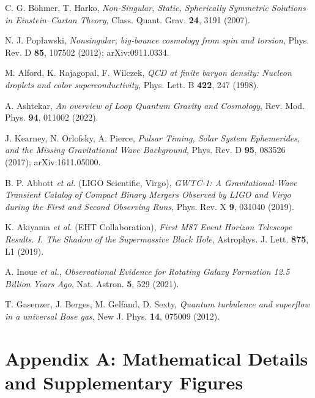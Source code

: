 \documentclass{article}
\begin{document}
\begin{thebibliography}{99}
  C. G. Böhmer, T. Harko,  
  \emph{Non‐Singular, Static, Spherically Symmetric Solutions in Einstein–Cartan Theory},  
  Class. Quant. Grav. \textbf{24}, 3191 (2007).  

  N. J. Popławski,  
  \emph{Nonsingular, big‐bounce cosmology from spin and torsion},  
  Phys. Rev. D \textbf{85}, 107502 (2012); arXiv:0911.0334.  

  M. Alford, K. Rajagopal, F. Wilczek,  
  \emph{QCD at finite baryon density: Nucleon droplets and color superconductivity},  
  Phys. Lett. B \textbf{422}, 247 (1998).  

  A. Ashtekar,  
  \emph{An overview of Loop Quantum Gravity and Cosmology},  
  Rev. Mod. Phys. \textbf{94}, 011002 (2022).  

  J. Kearney, N. Orlofsky, A. Pierce,  
  \emph{Pulsar Timing, Solar System Ephemerides, and the Missing Gravitational Wave Background},  
  Phys. Rev. D \textbf{95}, 083526 (2017); arXiv:1611.05000.  

  B. P. Abbott \emph{et al.} (LIGO Scientific, Virgo),  
  \emph{GWTC-1: A Gravitational‐Wave Transient Catalog of Compact Binary Mergers Observed by LIGO and Virgo during the First and Second Observing Runs},  
  Phys. Rev. X \textbf{9}, 031040 (2019).  

  K. Akiyama \emph{et al.} (EHT Collaboration),  
  \emph{First M87 Event Horizon Telescope Results. I. The Shadow of the Supermassive Black Hole},  
  Astrophys. J. Lett. \textbf{875}, L1 (2019).  

  A. Inoue \emph{et al.},  
  \emph{Observational Evidence for Rotating Galaxy Formation 12.5 Billion Years Ago},  
  Nat. Astron. \textbf{5}, 529 (2021).  

  T. Gasenzer, J. Berges, M. Gelfand, D. Sexty,  
  \emph{Quantum turbulence and superflow in a universal Bose gas},  
  New J. Phys. \textbf{14}, 075009 (2012).  

\end{thebibliography}

\clearpage

\clearpage
\appendix

\section*{Appendix A: Mathematical Details and Supplementary Figures}
\label{app:math_supp}
\end{document}
